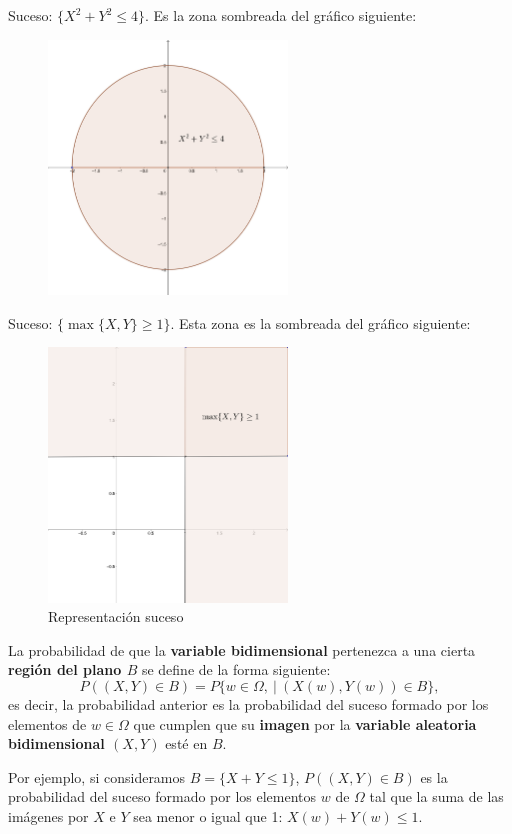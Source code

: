 \documentclass[]{book}
\begin{document}
Suceso: \(\{X^2+Y^2\leq 4\}\). Es la zona sombreada del gráfico siguiente:

\begin{figure}

{\centering \includegraphics[width=2.5in]{Images/Bidim2} 

}

\end{figure}

Suceso: \(\{\max\{X,Y\}\geq 1\}\). Esta zona es la sombreada del gráfico siguiente:

\begin{figure}
\includegraphics[width=2.5in]{Images/Bidim3} \caption{Representación suceso}\label{fig:bid3}
\end{figure}

La probabilidad de que la \textbf{variable bidimensional} pertenezca a una cierta \textbf{región del plano \(B\)} se define de la forma siguiente:
\[
P((X,Y)\in B)=P\{w\in \Omega,\ |\ (X(w),Y(w))\in B\},
\]
es decir, la probabilidad anterior es la probabilidad del suceso formado por los elementos de \(w\in\Omega\) que cumplen que su \textbf{imagen} por la \textbf{variable aleatoria bidimensional \((X,Y)\)} esté en \(B\).

Por ejemplo, si consideramos \(B=\{X+Y\leq 1\}\), \(P((X,Y)\in B)\) es la probabilidad del suceso formado por los elementos \(w\) de \(\Omega\) tal que la suma de las imágenes por \(X\) e \(Y\) sea menor o igual que 1: \(X(w)+Y(w)\leq 1\).
\end{document}
